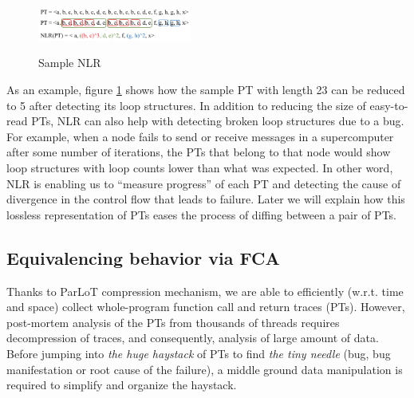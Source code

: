 \begin{figure}[]
\caption{Sample NLR}
\includegraphics[width=0.45\textwidth]{figs/NLRexample.png}
\label{fig.NLRexample}
\end{figure}

As an example, figure \ref{fig.NLRexample} shows how the sample PT with length 23 can be reduced to 5 after detecting its loop structures.
%
In addition to reducing the size of easy-to-read PTs, NLR can also help with detecting broken loop structures due to a bug. 
%
For example, when a node fails to send or receive messages in a supercomputer after some number of iterations, the PTs that belong to that node would show loop structures with loop counts lower than what was expected. 
%
In other word, NLR is enabling us to ``measure progress'' of each PT and detecting the cause of divergence in the control flow that leads to failure.
%
Later we will explain how this lossless representation of PTs eases the process of diffing between a pair of PTs.

\subsection{Equivalencing behavior via FCA}
\label{subsec:fca}
Thanks to ParLoT compression mechanism, we are able to efficiently (w.r.t. time and space) collect whole-program function call and return traces (PTs). However, post-mortem analysis of the PTs from thousands of threads requires decompression of traces, and consequently, analysis of large amount of data. Before jumping into \textit{the huge haystack} of PTs to find \textit{the tiny needle} (bug, bug manifestation or root cause of the failure), a middle ground data manipulation is required to simplify and organize the haystack. 

